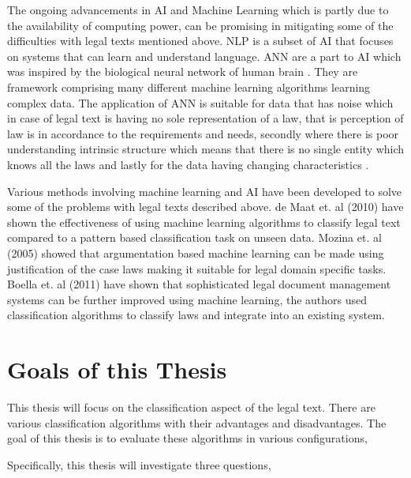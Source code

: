The ongoing advancements in \gls{AI} and Machine Learning which is partly due to the availability of computing power, can be promising in mitigating some of the difficulties with legal texts mentioned above. \gls{NLP} is a subset of \gls{AI} that focuses on systems that can learn and understand language. \gls{ANN} are a part to AI which was inspired by the biological neural network of human brain \cite{van2018artificial}. They are framework comprising many different machine learning algorithms learning complex data. The application of \gls{ANN} is suitable for data that has noise which in case of legal text is having no sole representation of a law, that is perception of law is in accordance to the requirements and needs, secondly where there is poor understanding intrinsic structure which means that there is no single entity which knows all the laws and lastly for the data having changing characteristics \cite{merkl1997exploration}. 

Various methods involving machine learning and \gls{AI} have been developed to solve some of the problems with legal texts described above. de Maat et. al (2010) \cite{de2010machine} have shown the effectiveness of using machine learning algorithms to classify legal text compared to a pattern based classification task on unseen data. Mozina et. al (2005) \cite{movzina2005argument} showed that argumentation based machine learning can be made using justification of the case laws making it suitable for legal domain specific tasks. Boella et. al (2011) \cite{boella2011using} have shown that sophisticated legal document management systems can be further improved using machine learning, the authors used classification algorithms to classify laws and integrate into an existing system. 



\section{Goals of this Thesis}
This thesis will focus on the classification aspect of the legal text. There are various classification algorithms with their advantages and disadvantages. The goal of this thesis is to evaluate these algorithms in various configurations, 

Specifically, this thesis will investigate three questions,

